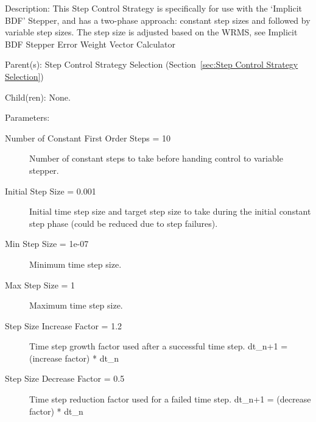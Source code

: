 \begin{list}{}
  {\setlength{\leftmargin}{1.0in}
   \setlength{\labelwidth}{0.75in}
   \setlength{\labelsep}{0.125in}}
  \item[Description:]
    This Step Control Strategy is specifically for use with the `Implicit BDF' Stepper, and has a two-phase approach: constant step sizes and followed by variable step sizes.  The step size is adjusted based on the WRMS, see Implicit BDF Stepper Error Weight Vector Calculator
  \item[Parent(s):]
    Step Control Strategy Selection (Section~\ref{sec:Step Control Strategy Selection})
  \item[Child(ren):]
    None. 
  \item[Parameters:]
    \begin{description}
      \item[Number of Constant First Order Steps = 10] 
Number of constant steps to take before handing control to variable stepper.
      \item[Initial Step Size = 0.001] 
Initial time step size and target step size to take during the initial constant step phase (could be reduced due to step failures).
      \item[Min Step Size = 1e-07] 
Minimum time step size.
      \item[Max Step Size = 1] 
Maximum time step size.
      \item[Step Size Increase Factor = 1.2] 
Time step growth factor used after a successful time step. dt\_{n+1} = (increase factor) * dt\_n
      \item[Step Size Decrease Factor = 0.5] 
Time step reduction factor used for a failed time step. dt\_{n+1} = (decrease factor) * dt\_n

\end{description}
\end{list}
